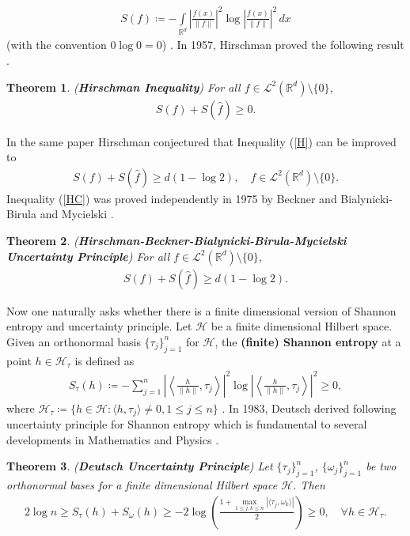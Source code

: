 \documentclass{amsart}
\newtheorem{theorem}{Theorem}[section]
\begin{document}
\begin{align*}
	S(f)\coloneqq  -\int\limits_{\mathbb{R}^d}	\left|\frac{f(x)}{\|f\|} \right|^2\log \left|\frac{f(x)}{\|f\|} \right|^2\,dx
\end{align*} 
 (with the convention $0\log0=0$) \cite{SHANNON}. In 1957, Hirschman proved the following result \cite{HIRSCHMAN}. 
\begin{theorem}\cite{HIRSCHMAN} (\textbf{Hirschman Inequality})
For all	$f \in \mathcal{L}^2 (\mathbb{R}^d) \setminus \{0\}$, 
\begin{align}\label{H}
	S(f)+S(\widehat{f})\geq 0.
\end{align}
\end{theorem}
In the same paper \cite{HIRSCHMAN} Hirschman conjectured that Inequality (\ref{H}) can be improved to 
\begin{align}\label{HC}
	S(f)+S(\widehat{f})\geq d(1-\log 2), \quad f \in \mathcal{L}^2 (\mathbb{R}^d) \setminus \{0\}.
\end{align}
Inequality (\ref{HC}) was proved independently in 1975  by Beckner  \cite{BECKNER} and Bialynicki-Birula and Mycielski \cite{BIALYNICKIBIRULA}.
\begin{theorem}\cite{BECKNER, BIALYNICKIBIRULA} (\textbf{Hirschman-Beckner-Bialynicki-Birula-Mycielski Uncertainty Principle})
	For all	$f \in \mathcal{L}^2 (\mathbb{R}^d) \setminus \{0\}$, 
	\begin{align*}
		S(f)+S(\widehat{f})\geq d(1-\log 2).
	\end{align*}
\end{theorem}
Now one naturally asks whether there is a finite dimensional version of Shannon entropy and uncertainty principle. 
Let $\mathcal{H}$ be a finite dimensional Hilbert space. Given an orthonormal basis  $\{\tau_j\}_{j=1}^n$ for $\mathcal{H}$, the \textbf{ (finite) Shannon entropy}  at a point $h \in \mathcal{H}_\tau$ is defined as 
\begin{align*}
	S_\tau (h)\coloneqq - \sum_{j=1}^{n} \left|\left \langle \frac{h}{\|h\|}, \tau_j\right\rangle \right|^2\log \left|\left \langle \frac{h}{\|h\|}, \tau_j\right\rangle \right|^2\geq 0,
\end{align*}
where $\mathcal{H}_\tau\coloneqq \{h \in \mathcal{H}: \langle h , \tau_j \rangle \neq 0, 1\leq j \leq n\}$ \cite{DEUTSCH}. In 1983, Deutsch derived following uncertainty principle for Shannon entropy which is fundamental to several developments in Mathematics and   Physics \cite{DEUTSCH}.
\begin{theorem}\cite{DEUTSCH} (\textbf{Deutsch Uncertainty Principle})  \label{DU}
Let $\{\tau_j\}_{j=1}^n$,  $\{\omega_j\}_{j=1}^n$ be two orthonormal bases for a  finite dimensional Hilbert space $\mathcal{H}$. Then 
	\begin{align}\label{DUP}
2 \log n \geq S_\tau (h)+S_\omega (h)\geq -2 \log \left(\frac{1+\displaystyle \max_{1\leq j, k \leq n}|\langle\tau_j , \omega_k\rangle|}{2}\right)	\geq 0, \quad \forall h \in \mathcal{H}_\tau.
	\end{align}
\end{theorem}
\end{document}

